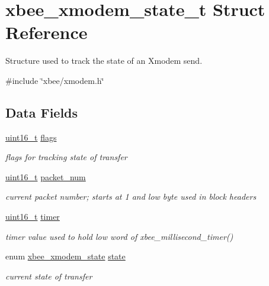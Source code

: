 \hypertarget{structxbee__xmodem__state__t}{}\section{xbee\+\_\+xmodem\+\_\+state\+\_\+t Struct Reference}
\label{structxbee__xmodem__state__t}


Structure used to track the state of an Xmodem send.  




{\ttfamily \#include \char`\"{}xbee/xmodem.\+h\char`\"{}}

\subsection*{Data Fields}
\begin{DoxyCompactItemize}
\item 
\hyperlink{group__hal__dos_ga5a8b2dc9e45a9ee81a94ef304fb62505}{uint16\+\_\+t} \hyperlink{group__util__xmodem_ga1e87af3c18a2fd36c61faf89949bdc3f}{flags}
\begin{DoxyCompactList}\small\item\em flags for tracking state of transfer \end{DoxyCompactList}\item 
\hyperlink{group__hal__dos_ga5a8b2dc9e45a9ee81a94ef304fb62505}{uint16\+\_\+t} \hyperlink{group__util__xmodem_ga59de4bab5575291b6b4ace70d7e50af5}{packet\+\_\+num}
\begin{DoxyCompactList}\small\item\em current packet number; starts at 1 and low byte used in block headers \end{DoxyCompactList}\item 
\hyperlink{group__hal__dos_ga5a8b2dc9e45a9ee81a94ef304fb62505}{uint16\+\_\+t} \hyperlink{group__util__xmodem_gaea00c2c1dec6e8f58532f25c65210d9e}{timer}
\begin{DoxyCompactList}\small\item\em timer value used to hold low word of xbee\+\_\+millisecond\+\_\+timer() \end{DoxyCompactList}\item 
enum \hyperlink{group__util__xmodem_gaca3fc49d80cd9afccc34812b2985484f}{xbee\+\_\+xmodem\+\_\+state} \hyperlink{group__util__xmodem_ga73b81fc5d708360fbba38aee9bc2eac0}{state}
\begin{DoxyCompactList}\small\item\em current state of transfer \end{DoxyCompactList}\item 

\end{DoxyCompactItemize}

